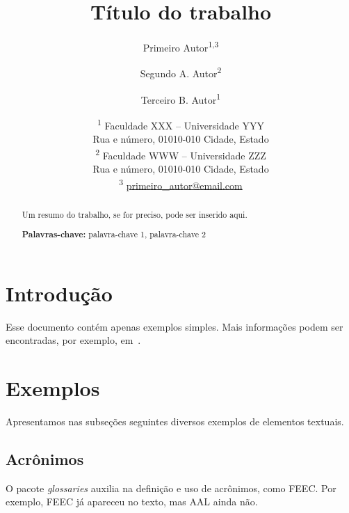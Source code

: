 \documentclass[a4paper,11pt]{article}
\begin{document}
\title{Título do trabalho}

\author{Primeiro Autor\textsuperscript{1,3}
\and Segundo A. Autor\textsuperscript{2}
\and Terceiro B. Autor\textsuperscript{1}}

\date{%
\textsuperscript{1} Faculdade XXX -- Universidade YYY\\
Rua e número, 01010-010 Cidade, Estado\\[1.6ex]
\textsuperscript{2} Faculdade WWW -- Universidade ZZZ\\
Rua e número, 01010-010 Cidade, Estado\\[1.6ex]
\textsuperscript{3} \href{mailto:primeiro_autor@email.com}{primeiro\_autor@email.com}}

\maketitle


\begin{abstract}

Um resumo do trabalho, se for preciso, pode ser inserido aqui.

{\bf\footnotesize Palavras-chave:} palavra-chave 1, palavra-chave 2

\end{abstract}


\tableofcontents


\section{Introdução}
\label{sec:intro}

Esse documento contém apenas exemplos simples.
Mais informações podem ser encontradas, por exemplo, em~\cite{oetiker_not_2015,latex_wikibook}.


\section{Exemplos}

Apresentamos nas subseções seguintes diversos exemplos de elementos textuais.


\subsection{Acrônimos}

O pacote \emph{glossaries} auxilia na definição e uso de acrônimos, como \gls{FEEC}.
Por exemplo, \gls{FEEC} já apareceu no texto, mas \gls{AAL} ainda não.
\end{document}
